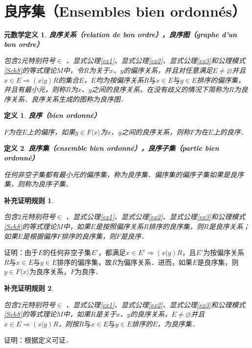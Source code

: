 \documentclass[12pt, a4paper, oneside]{book}
\newtheorem{metadef}{元数学定义}
\newtheorem{Ccor}{补充证明规则}
\newtheorem{de}{定义}
\begin{document}
		\section{良序集（Ensembles bien ordonnés）}		
			\begin{metadef}
				\textbf{良序关系（relation de bon ordre），良序图（graphe d'un bon ordre）}
				\par
				包含$2$元特别符号$\in$ 、显式公理\ref{ex1}、显式公理\ref{ex2}、显式公理\ref{ex3}和公理模式\ref{Sch8}的等式理论$M$中，令$R$为关于$x$、$y$的偏序关系，并且对任意满足$E\neq \varnothing$并且$x\in E\Rightarrow (x|y)R$的集合$E$，$E$均为按偏序关系$R\text{与}x\in E\text{与}y\in E$排序的偏序集，并且有最小元，则称$R$为$x$、$y$之间的良序关系，在没有歧义的情况下简称为$R$为良序关系．良序关系生成的图称为良序图．
			\end{metadef}
			
			\begin{de}
				\textbf{良序（bien ordonné）}
				\par
				$F$为在$E$上的偏序，如果$y\in F\langle x \rangle $为$x$、$y$之间的良序关系，则称$F$为在$E$上的良序．
			\end{de}
			
			\begin{de}
				\textbf{良序集（ensemble bien ordonné），良序子集（partie bien ordonné）}
				\par
				任何非空子集都有最小元的偏序集，称为良序集．偏序集的偏序子集如果是良序集，则称为良序子集．
			\end{de}
						
			\begin{Ccor}\label{Ccor84}
				\hfill\par
				包含$2$元特别符号$\in$ 、显式公理\ref{ex1}、显式公理\ref{ex2}、显式公理\ref{ex3}和公理模式\ref{Sch8}的等式理论$M$中，如果$E$是按照偏序关系$R$排序的良序集，则$R$是良序关系；如果$E$是根据偏序$F$排序的良序集，则$F$是良序．
			\end{Ccor}
			证明：由于$E$的任何非空子集$E'$，都满足$x\in E'\Rightarrow (x|y)R$，且$E'$为按偏序关系$R\text{与}x\in E\text{与}y\in E$排序的偏序集，故$R$为偏序关系．进而，如果$E$是良序集，则$y\in F\langle x \rangle $为良序关系，$F$为良序．
						
			\begin{Ccor}\label{Ccor85}
				\hfill\par
				包含$2$元特别符号$\in$ 、显式公理\ref{ex1}、显式公理\ref{ex2}、显式公理\ref{ex3}和公理模式\ref{Sch8}的等式理论$M$中，如果$R$是关于$x$、$y$的良序关系，$E\neq \varnothing$并且$x\in E\Rightarrow (x|y)R$，则按$R\text{与}x\in E\text{与}y\in E$排序的$E$，为良序集．
			\end{Ccor}
			证明：根据定义可证．
			
\end{document}
